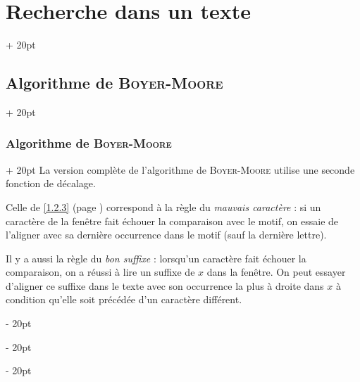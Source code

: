\documentclass[a4paper, 12pt, twoside]{article}
\newcommand{\ind}[1][20pt]{\advance\leftskip + #1}
\newcommand{\deind}[1][20pt]{\advance\leftskip - #1}
\newenvironment{indt}[2][20pt]{#2 \par \ind[#1]}{\par \deind} %
\begin{document}
\begin{indt}{\section{Recherche dans un texte}}
\begin{indt}{\subsection{Algorithme de \textsc{Boyer-Moore}}}
            \vspace{12pt}
            
            \begin{indt}{\subsubsection{Algorithme de \textsc{Boyer-Moore}}}
                La version complète de l'algorithme de \textsc{Boyer-Moore} utilise une seconde fonction de décalage.

                Celle de \ref{1.2.3} (page \pageref{1.2.3}) correspond à la règle du \textit{mauvais caractère} : si un caractère de la fenêtre fait échouer la comparaison avec le motif, on essaie de l'aligner avec sa dernière occurrence dans le motif (sauf la dernière lettre).

                Il y a aussi la règle du \textit{bon suffixe} : lorsqu'un caractère fait échouer la comparaison, on a réussi à lire un suffixe de $x$ dans la fenêtre. On peut essayer d'aligner ce suffixe dans le texte avec son occurrence la plus à droite dans $x$ à condition qu'elle soit précédée d'un caractère différent.

                \begin{center}
\end{center}
\end{indt}
\end{indt}
\end{indt}
\end{document}
